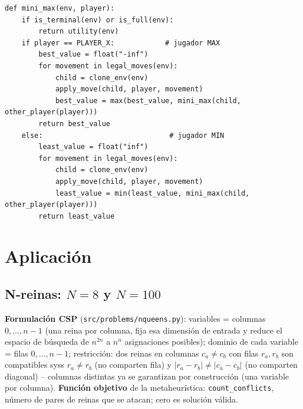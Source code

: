 \documentclass[11pt,onecolumn,letterpaper]{article}
\newcommand{\code}[1]{\texttt{#1}}
\begin{document}
\begin{lstlisting}[caption={Valor minimax recursivo (\code{src/adversarial/minimax.py}).}, label={lst:minimax}]
def mini_max(env, player):
    if is_terminal(env) or is_full(env):
        return utility(env)
    if player == PLAYER_X:            # jugador MAX
        best_value = float("-inf")
        for movement in legal_moves(env):
            child = clone_env(env)
            apply_move(child, player, movement)
            best_value = max(best_value, mini_max(child, other_player(player)))
        return best_value
    else:                              # jugador MIN
        least_value = float("inf")
        for movement in legal_moves(env):
            child = clone_env(env)
            apply_move(child, player, movement)
            least_value = min(least_value, mini_max(child, other_player(player)))
        return least_value
\end{lstlisting}

\section{Aplicaci\'on}

\subsection{N-reinas: $N=8$ y $N=100$}
\label{sec:app-nqueens}

\textbf{Formulaci\'on CSP} (\code{src/problems/nqueens.py}): variables = columnas
$0,\dots,n-1$ (una reina por columna, fija esa dimensi\'on de entrada y reduce el espacio
de b\'usqueda de $n^{2n}$ a $n^n$ asignaciones posibles); dominio de cada variable = filas
$0,\dots,n-1$; restricci\'on: dos reinas en columnas $c_a\neq c_b$ con filas $r_a,r_b$ son
compatibles syss $r_a\neq r_b$ (no comparten fila) y $|r_a-r_b|\neq|c_a-c_b|$ (no comparten
diagonal) -- columnas distintas ya se garantizan por construcci\'on (una variable por
columna). \textbf{Funci\'on objetivo} de la metaheur\'istica: \code{count\_conflicts},
n\'umero de pares de reinas que se atacan; cero es soluci\'on v\'alida.
\end{document}
